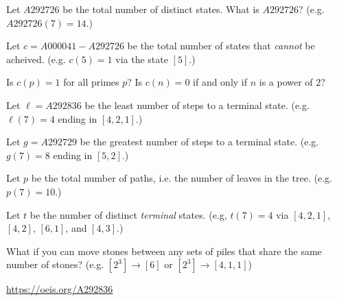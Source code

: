 \documentclass{article}
\begin{document}
\begin{related}
  \item Let $A292726$ be the total number of distinct states. What is $A292726$?
    (e.g. $A292726(7) = 14$.)
  \item Let $c = A000041 - A292726$ be the total number of states that \textit{cannot} be acheived.
    (e.g. $c(5) = 1$ via the state $[5]$.)
  \item Is $c(p) = 1$ for all primes $p$? Is $c(n) = 0$ if and only if $n$ is a power of $2$?
  \item Let $\ell = A292836$ be the least number of steps to a terminal state.
    (e.g. $\ell(7) = 4$ ending in $[4,2,1]$.)
  \item Let $g = A292729$ be the greatest number of steps to a terminal state.
    (e.g. $g(7) = 8$ ending in $[5,2]$.)
  \item Let $p$ be the total number of paths, i.e. the number of leaves in the
    tree. (e.g. $p(7) = 10$.)
  \item Let $t$ be the number of distinct \textit{terminal} states.
    (e.g, $t(7) = 4$ via $[4,2,1]$, $[4,2]$, $[6, 1]$, and $[4, 3]$.)
  \item What if you can move stones between any sets of piles that share the
    same number of stones? (e.g. $[2^3] \rightarrow [6]$ or $[2^3] \rightarrow [4, 1, 1]$)
\end{related}

\begin{references}
  \item \url{https://oeis.org/A292836}
\end{references}
\end{document}
